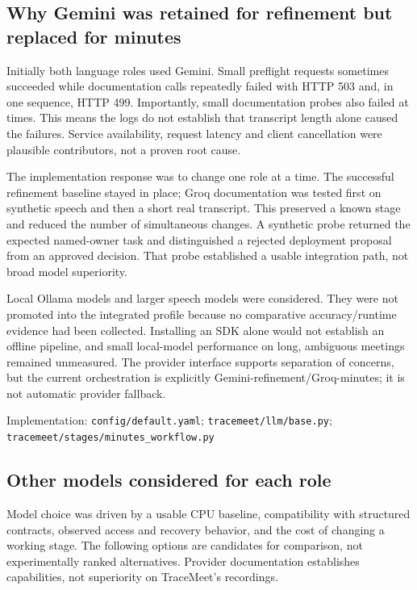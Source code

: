 \documentclass[11pt,a4paper]{article}
\newcommand{\code}[1]{\nolinkurl{#1}}
\newcommand{\src}[1]{\par{\footnotesize\raggedright\textcolor{accent}{Implementation:} #1\par}}
\begin{document}
\subsection{Why Gemini was retained for refinement but replaced for minutes}
Initially both language roles used Gemini. Small preflight requests sometimes succeeded while documentation calls repeatedly failed with HTTP 503 and, in one sequence, HTTP 499. Importantly, small documentation probes also failed at times. This means the logs do not establish that transcript length alone caused the failures. Service availability, request latency and client cancellation were plausible contributors, not a proven root cause.

The implementation response was to change one role at a time. The successful refinement baseline stayed in place; Groq documentation was tested first on synthetic speech and then a short real transcript. This preserved a known stage and reduced the number of simultaneous changes. A synthetic probe returned the expected named-owner task and distinguished a rejected deployment proposal from an approved decision. That probe established a usable integration path, not broad model superiority.

Local Ollama models and larger speech models were considered. They were not promoted into the integrated profile because no comparative accuracy/runtime evidence had been collected. Installing an SDK alone would not establish an offline pipeline, and small local-model performance on long, ambiguous meetings remained unmeasured. The provider interface supports separation of concerns, but the current orchestration is explicitly Gemini-refinement/Groq-minutes; it is not automatic provider fallback.
\src{\code{config/default.yaml}; \code{tracemeet/llm/base.py}; \code{tracemeet/stages/minutes_workflow.py}}

\subsection{Other models considered for each role}
Model choice was driven by a usable CPU baseline, compatibility with structured contracts, observed access and recovery behavior, and the cost of changing a working stage. The following options are candidates for comparison, not experimentally ranked alternatives. Provider documentation establishes capabilities, not superiority on TraceMeet's recordings.
\end{document}
